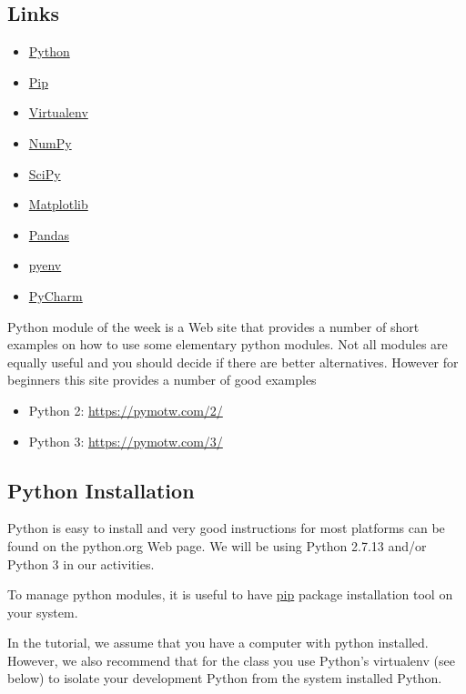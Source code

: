 \subsection{Links}\label{links}

\begin{itemize}

\item
  \href{https://www.python.org/}{Python}
\item
  \href{https://pip.pypa.io/en/stable/}{Pip}
\item
  \href{https://virtualenv.pypa.io/en/stable/}{Virtualenv}
\item
  \href{http://www.numpy.org/}{NumPy}
\item
  \href{https://scipy.org/}{SciPy}
\item
  \href{http://matplotlib.org/}{Matplotlib}
\item
  \href{http://pandas.pydata.org/}{Pandas}
\item
  \href{https://github.com/pyenv/pyenv}{pyenv}
\item
  \href{https://github.com/pyenv/pyenv}{PyCharm}
\end{itemize}

Python module of the week is a Web site that provides a number of short
examples on how to use some elementary python modules. Not all modules
are equally useful and you should decide if there are better
alternatives. However for beginners this site provides a number of good
examples

\begin{itemize}

\item
  Python 2: \url{https://pymotw.com/2/}
\item
  Python 3: \url{https://pymotw.com/3/}
\end{itemize}

\subsection{Python Installation}\label{python-installation}

Python is easy to install and very good instructions for most platforms
can be found on the python.org Web page. We will be using Python 2.7.13
and/or Python 3 in our activities.

To manage python modules, it is useful to have
\href{https://pypi.python.org/pypi/pip}{pip} package installation tool
on your system.

In the tutorial, we assume that you have a computer with python
installed. However, we also recommend that for the class you use
Python's virtualenv (see below) to isolate your development Python from
the system installed Python.

